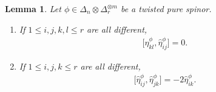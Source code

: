 \documentclass[pdftex]{sigma}
\numberwithin{equation}{section}
\newtheorem{Lemma}[Theorem]{Lemma}
\begin{document}
\begin{Lemma}\label{commutators} Let $\phi\in\Delta_n\otimes\Delta_r^{\otimes m}$ be a twisted pure spinor.
\begin{enumerate}\itemsep=0pt
 \item[$1.$] If $1\leq i,j,k,l\leq r$ are all different,
 \begin{gather}
 \big[\hat\eta_{kl}^\phi,\hat\eta_{ij}^\phi\big]=0.\label{[kl,ij]=0}
 \end{gather}
\item[$2.$] If $1\leq i,j,k\leq r$ are all different,
 \begin{gather}
 \big[\hat\eta_{ij}^\phi,\hat\eta_{jk}^\phi\big]=-2 \hat\eta_{ik}^\phi.\label{[ij,jk]=-ik}
 \end{gather}
\end{enumerate}
\end{Lemma}
\end{document}
